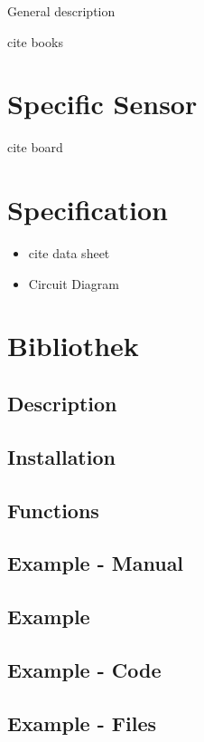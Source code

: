 General description

cite books

\section{Specific Sensor}

cite board

\section{Specification}

\begin{itemize}
  \item cite data sheet
  \item Circuit Diagram
\end{itemize}

\section{Bibliothek}

\subsection{Description}

\subsection{Installation}

\subsection{Functions}

\subsection{Example - Manual}

\subsection{Example}

\subsection{Example - Code}

\subsection{Example - Files}



